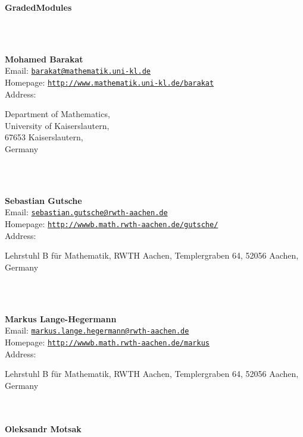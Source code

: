 \documentclass[a4paper,11pt]{report}
\newcommand{\maintitlesize}{\fontsize{50}{55}\selectfont}
\begin{document}
\begin{titlepage}
\begin{center}{\maintitlesize \textbf{\textsf{GradedModules}\mbox{}}}
\end{center}\vfill

\mbox{}\\
{\mbox{}\\
\small \noindent \textbf{Mohamed Barakat\\
    }  Email: \href{mailto://barakat@mathematik.uni-kl.de} {\texttt{barakat@mathematik.uni-kl.de}}\\
  Homepage: \href{http://www.mathematik.uni-kl.de/~barakat} {\texttt{http://www.mathematik.uni-kl.de/\texttt{}barakat}}\\
  Address: \begin{minipage}[t]{8cm}\noindent
 Department of Mathematics, \\
 University of Kaiserslautern, \\
 67653 Kaiserslautern, \\
 Germany \end{minipage}
}\\
{\mbox{}\\
\small \noindent \textbf{Sebastian Gutsche\\
    }  Email: \href{mailto://sebastian.gutsche@rwth-aachen.de} {\texttt{sebastian.gutsche@rwth-aachen.de}}\\
  Homepage: \href{http://wwwb.math.rwth-aachen.de/~gutsche/} {\texttt{http://wwwb.math.rwth-aachen.de/\texttt{}gutsche/}}\\
  Address: \begin{minipage}[t]{8cm}\noindent
 Lehrstuhl B f{\"u}r Mathematik, RWTH Aachen, Templergraben 64, 52056 Aachen,
Germany \end{minipage}
}\\
{\mbox{}\\
\small \noindent \textbf{Markus Lange-Hegermann\\
    }  Email: \href{mailto://markus.lange.hegermann@rwth-aachen.de} {\texttt{markus.lange.hegermann@rwth-aachen.de}}\\
  Homepage: \href{http://wwwb.math.rwth-aachen.de/~markus} {\texttt{http://wwwb.math.rwth-aachen.de/\texttt{}markus}}\\
  Address: \begin{minipage}[t]{8cm}\noindent
 Lehrstuhl B f{\"u}r Mathematik, RWTH Aachen, Templergraben 64, 52056 Aachen,
Germany \end{minipage}
}\\
{\mbox{}\\
\small \noindent \textbf{Oleksandr Motsak\\
}}
\end{titlepage}
\end{document}
